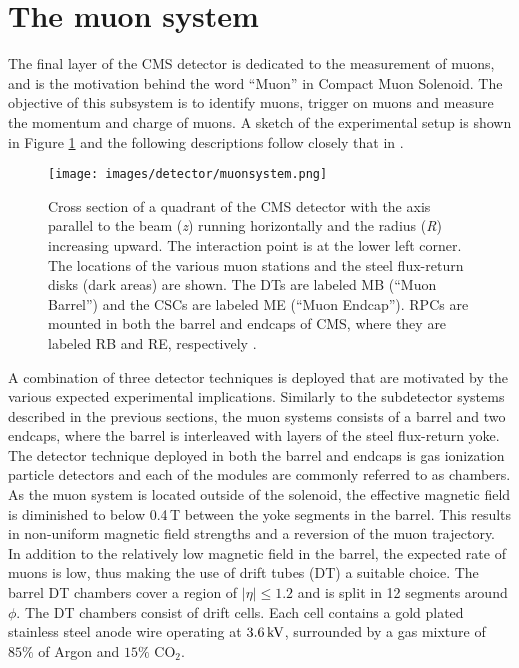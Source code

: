 \section{The muon system}\label{sec:muonsystem}
\noindent\justify
The final layer of the CMS detector is dedicated to the measurement of muons, and is the motivation behind the word ``Muon'' in Compact Muon Solenoid. 
The objective of this subsystem is to identify muons, trigger on muons and measure the momentum and charge of muons. 
A sketch of the experimental setup is shown in Figure \ref{fig:Muon} and the following descriptions follow closely that in \cite{Chatrchyan:2012xi}. 
\begin{figure}[!htp]
  \centering
   \texttt{[image: images/detector/muonsystem.png]}
   \caption{Cross section of a quadrant of the CMS detector with the axis parallel to the beam (\textit{z}) running horizontally and the radius (\textit{R}) increasing upward. The interaction point is at the lower left corner. The locations of the various muon stations and the steel flux-return disks (dark areas) are shown. The DTs are labeled MB (``Muon Barrel'') and the CSCs are labeled ME (``Muon Endcap''). RPCs are mounted in both the barrel and endcaps of CMS, where they are labeled RB and RE, respectively \cite{Chatrchyan:2012xi}.}
   \label{fig:Muon}
\end{figure}                                                                                            
A combination of three detector techniques is deployed that are motivated by the various expected experimental implications. 
Similarly to the subdetector systems described in the previous sections, the muon systems consists of a barrel and two endcaps, where the barrel is interleaved with layers of the steel flux-return yoke. 
\newpara
\noindent\justify
The detector technique deployed in both the barrel and endcaps is gas ionization particle detectors and each of the modules are commonly referred to as chambers. 
As the muon system is located outside of the solenoid, the effective magnetic field is diminished to below 0.4$\,$T between the yoke segments in the barrel. 
This results in non-uniform magnetic field strengths and a reversion of the muon trajectory. 
In addition to the relatively low magnetic field in the barrel, the expected rate of muons is low, thus making the use of drift tubes (DT) a suitable choice. 
The barrel DT chambers cover a region of $|\eta|\leq1.2$ and is split in 12 segments around $\phi$. 
The DT chambers consist of drift cells. 
Each cell contains a gold plated stainless steel anode wire operating at $3.6\,\text{k\hspace{-.08em}V}$, surrounded by a gas mixture of $85\%$ of Argon and $15\%$ $\mathrm{CO_{2}}$. 
